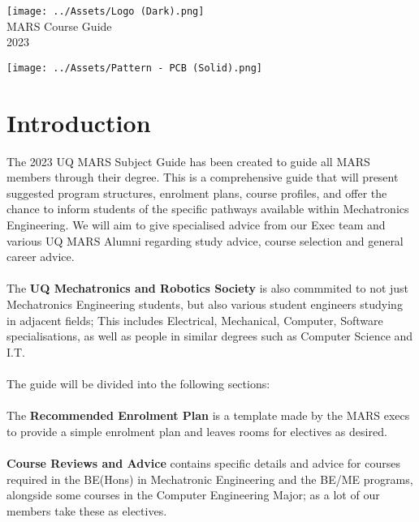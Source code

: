 \documentclass[a4paper,12pt]{report}
\begin{document}
\begin{titlepage}
    \begin{center}
        \vspace*{15mm}
        \texttt{[image: ../Assets/Logo (Dark).png]} \\
        \vspace{1cm}
        \Huge MARS Course Guide \\
        \huge \textcolor{turbo_purple}{2023}
    \end{center}
    \vfill
    \texttt{[image: ../Assets/Pattern - PCB (Solid).png]}
    \vspace*{10mm}
\end{titlepage}
\restoregeometry
\newpage
\tableofcontents
\chapter*{Introduction}
    The 2023 UQ MARS Subject Guide has been created to guide all MARS members through their degree. This is a comprehensive guide that will present suggested program structures, enrolment plans, course profiles, and offer the chance to inform students of the specific pathways available within Mechatronics Engineering. We will aim to give specialised advice from our Exec team and various UQ MARS Alumni regarding study advice, course selection and general career advice. \\
    \\ The \textbf{UQ Mechatronics and Robotics Society} is also commmited to not just Mechatronics Engineering students, but also various student engineers studying in adjacent fields; This includes Electrical, Mechanical, Computer, Software specialisations, as well as people in similar degrees such as Computer Science and I.T. \\
    \\ The guide will be divided into the following sections: \\
    \\ The \textbf{Recommended Enrolment Plan} is a template made by the MARS execs to provide a simple enrolment plan and leaves rooms for electives as desired. \\
    \\ \textbf{Course Reviews and Advice} contains specific details and advice for courses required in the BE(Hons) in Mechatronic Engineering and the BE/ME programs, alongside some courses in the Computer Engineering Major; as a lot of our members take these as electives. \\
   
\end{document}
